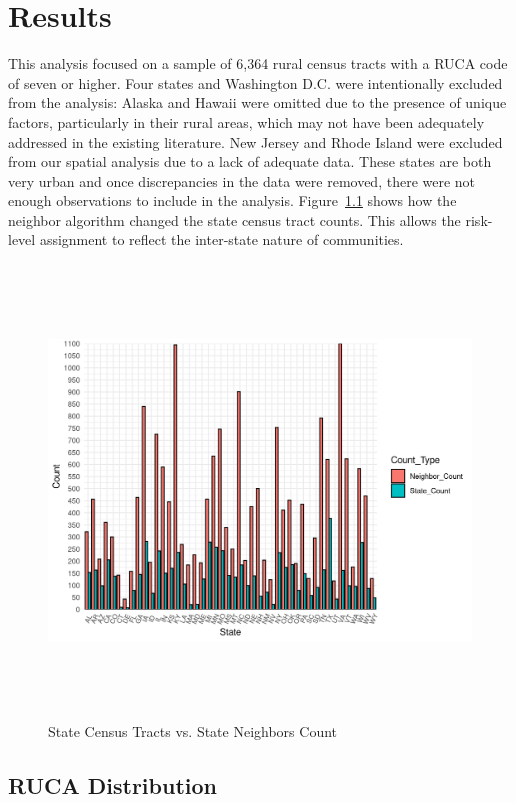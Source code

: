 \chapter{Results}	

This analysis focused on a sample of 6,364 rural census tracts with a RUCA code of seven or higher. Four states and Washington D.C. were intentionally excluded from the analysis: Alaska and Hawaii were omitted due to the presence of unique factors, particularly in their rural areas, which may not have been adequately addressed in the existing literature.  New Jersey and Rhode Island were excluded from our spatial analysis due to a lack of adequate data. These states are both very urban and once discrepancies in the data were removed, there were not enough observations to include in the analysis.  Figure~\ref{fig:neighbors_bar} 
shows how the neighbor algorithm changed the state census tract counts. This allows the risk-level assignment to reflect the inter-state nature of communities. 

\begin{figure}[htbp]
   \centering
    \includegraphics[width=1\textwidth, height=12cm]{plots/neighbors.png}
    \caption{State Census Tracts vs. State Neighbors Count}
    \label{fig:neighbors_bar}
\end{figure}


\section{RUCA Distribution}

